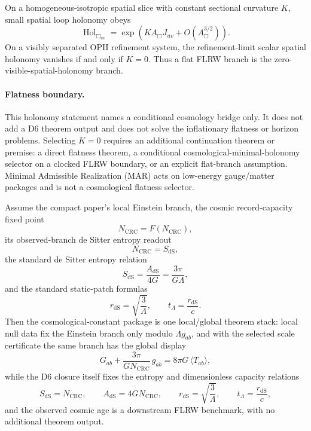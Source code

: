 \begin{lemma}
On a homogeneous-isotropic spatial slice with constant sectional curvature \(K\), small spatial
loop holonomy obeys
\[
\operatorname{Hol}_{\Box_{uv}}=\exp\!\left(KA_\Box J_{uv}+O(A_\Box^{3/2})\right).
\]
On a visibly separated OPH refinement system, the refinement-limit scalar spatial holonomy vanishes
if and only if \(K=0\). Thus a flat FLRW branch is the zero-visible-spatial-holonomy branch.
\end{lemma}

\paragraph{Flatness boundary.}
This holonomy statement names a conditional cosmology bridge only. It does not add a D6 theorem
output and does not solve the inflationary flatness or horizon problems. Selecting \(K=0\) requires
an additional continuation theorem or premise: a direct flatness theorem, a conditional
cosmological-minimal-holonomy selector on a clocked FLRW boundary, or an explicit flat-branch
assumption. Minimal Admissible Realization (MAR) acts on low-energy gauge/matter packages and is not a cosmological flatness
selector.

\begin{theorem}
Assume the compact paper's local Einstein branch, the cosmic record-capacity fixed point
\[
N_{\mathrm{CRC}}=F(N_{\mathrm{CRC}}),
\]
its observed-branch de Sitter entropy readout
\[
N_{\mathrm{CRC}}=S_{\mathrm{dS}},
\]
\noindent the standard de Sitter entropy relation
\[
S_{\mathrm{dS}}=\frac{A_{\mathrm{dS}}}{4G}=\frac{3\pi}{G\Lambda},
\]
and the standard static-patch formulas
\[
r_{\mathrm{dS}}=\sqrt{\frac{3}{\Lambda}},
\qquad
t_\Lambda=\frac{r_{\mathrm{dS}}}{c}.
\]
Then the cosmological-constant package is one local/global theorem stack: local null data fix the
Einstein branch only modulo \(\Lambda g_{ab}\), and with the selected scale certificate the same branch
has the global display
\[
G_{ab}+\frac{3\pi}{G N_{\mathrm{CRC}}}\,g_{ab}=8\pi G\,\langle T_{ab}\rangle,
\]
while the D6 closure itself fixes the entropy and dimensionless capacity relations
\[
S_{\mathrm{dS}}=N_{\mathrm{CRC}},
\qquad
A_{\mathrm{dS}}=4G N_{\mathrm{CRC}},
\qquad
r_{\mathrm{dS}}=\sqrt{\frac{3}{\Lambda}},
\qquad
t_\Lambda=\frac{r_{\mathrm{dS}}}{c},
\]
and the observed cosmic age is a downstream FLRW benchmark, with no additional theorem
output.
\end{theorem}

